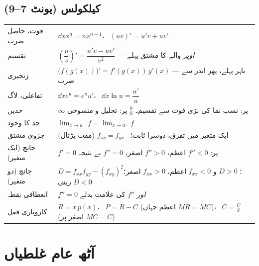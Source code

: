\subsection*{کیلکولس (یونٹ \textenglish{7--9})}

\begin{center}
\begin{tabular}{@{}p{4.0cm} p{11.0cm}@{}}
\toprule
قوت، حاصل ضرب & \(\dd{}{x}x^{n}=nx^{n-1}\)، \ \((uv)'=u'v+uv'\) \\
تقسیم & \(\left(\dfrac uv\right)'=\dfrac{u'v-uv'}{v^{2}}\) --- \emph{اوپر} والے کا مشتق پہلے \\
زنجیری & \(\bigl(f(g(x))\bigr)'=f'(g(x))\,g'(x)\) --- باہر پہلے، پھر اندر سے ضرب \\
تفاعلی، لاگ & \(\dd{}{x}e^{u}=e^{u}u'\)، \ \(\dd{}{x}\ln u=\dfrac{u'}{u}\) \\
حدیں & \(\infty\) پر: نسب نما کی بڑی قوت سے تقسیم۔ \(\tfrac00\) پر: تحلیل و منسوخی \\
حد کا وجود & \(\lim_{x\to a^{-}}f=\lim_{x\to a^{+}}f\) \\
جزوی مشتق & ایک متغیر میں تفرق، دوسرا ثابت؛ \ \(f_{xy}=f_{yx}\) (مفت پڑتال) \\
جانچ (ایک متغیر) & \(f'=0\) پر: \(f''<0\) اعظم، \(f''>0\) اصغر، \(f''=0\) بے نتیجہ \\
جانچ (دو متغیر) & \(D=f_{xx}f_{yy}-(f_{xy})^{2}\)؛ \(D>0\) و \(f_{xx}<0\) اعظم، \(f_{xx}>0\) اصغر؛ \(D<0\) زینی \\
انعطافی نقطہ & \(f''=0\) \emph{اور} \(f''\) کی علامت بدلے \\
کاروباری فعل & \(R=x\,p(x)\)، \ \(P=R-C\) (اعظم جہاں \(MR=MC\))، \ \(\bar{C}=\tfrac{C}{x}\) (اصغر پر \(MC=\bar{C}\)) \\
\bottomrule
\end{tabular}
\end{center}

\clearpage

\section*{آٹھ عام غلطیاں}

